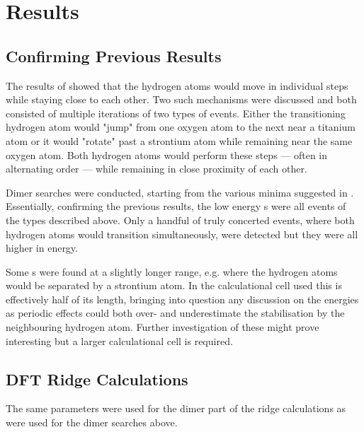 \section{Results}
\label{sec:perovskites-results}


\subsection{Confirming Previous Results}
The results of \cite{double-defect-2011} showed that the hydrogen atoms would move in individual steps while staying close to each other.
Two such mechanisms were discussed and both consisted of multiple iterations of two types of events.
Either the transitioning hydrogen atom would "jump" from one oxygen atom to the next near a titanium atom or it would "rotate" past a strontium atom while remaining near the same oxygen atom.
Both hydrogen atoms would perform these steps --- often in alternating order --- while remaining in close proximity of each other.

Dimer  searches were conducted, starting from the various minima suggested in \cite{double-defect-2011}.
Essentially, confirming the previous results, the low energy s were all events of the types described above.
Only a handful of truly concerted events, where both hydrogen atoms would transition simultaneously, were detected but they were all higher in energy.

Some s were found at a slightly longer range, e.g. where the hydrogen atoms would be separated by a strontium atom.
In the calculational cell used this is effectively half of its length, bringing into question any discussion on the energies as periodic effects could both over- and underestimate the stabilisation by the neighbouring hydrogen atom.
Further investigation of these might prove interesting but a larger calculational cell is required.

\subsection{DFT Ridge Calculations}
The same parameters were used for the dimer part of the ridge calculations as were used for the dimer searches above.

